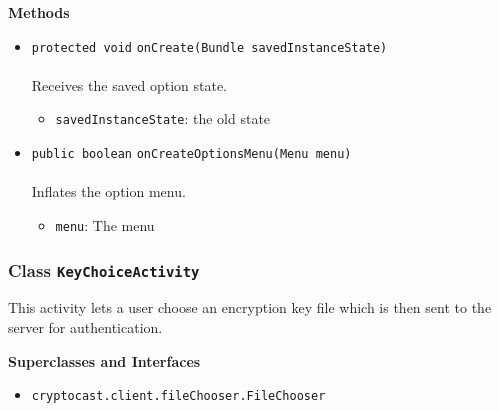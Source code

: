 \textbf{\sffamily Methods}
\begin{itemize}
\item \lstinline|protected void| \lstinline|onCreate|\lstinline|(Bundle savedInstanceState)|\\ \\[-0.6em]
Receives the saved option state.
\begin{itemize}
\item \lstinline|savedInstanceState|: the old state
\end{itemize}



\item \lstinline|public boolean| \lstinline|onCreateOptionsMenu|\lstinline|(Menu menu)|\\ \\[-0.6em]
Inflates the option menu.
\begin{itemize}
\item \lstinline|menu|: The menu
\end{itemize}



\end{itemize}

\subsubsection{Class \lstinline|KeyChoiceActivity|}
This activity lets a user choose an encryption key file
 which is then sent to the server for authentication. \\
\noindent\begin{minipage}[t]{5cm}
\vspace{0.3em}
\hspace*{2em}
\vspace{0.3em}
\end{minipage}



\textbf{\sffamily Superclasses and Interfaces}
\begin{itemize}
\item \lstinline|cryptocast.client.fileChooser.FileChooser|
\end{itemize}



